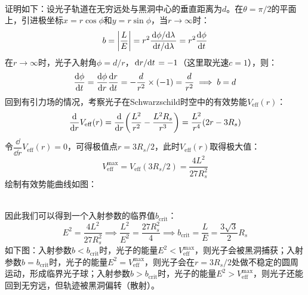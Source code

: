 \documentclass[a4paper]{article}
\begin{document}
\begin{enumerate}
{\begin{figure}
    \end{figure} \\
    证明如下：设光子轨道在无穷远处与黑洞中心的垂直距离为$d$。在$\theta = \pi/2$的平面上，引进极坐标$x = r\cos{\phi}$和$y = r\sin{\phi}$，当$r \to \infty$时：
    \[
        b = \abs{\frac{L}{E}} = r^2 \frac{\dv*{\phi}{\lambda}}{\dv*{t}{\lambda}} = r^2 \dv{\phi}{t}
    \]
    在$r \to \infty$时，光子入射角$\phi = d/r$，$\dv*{r}{t} = -1$（这里取光速$c = 1$），则：
    \[
        \dv{\phi}{t} = \dv{\phi}{r} \dv{r}{t} = -\frac{d}{r^2} \times (-1) = \frac{d}{r^2} \implies b = d
    \]
    回到有引力场的情况，考察光子在Schwarzschild时空中的有效势能$V_{\mathrm{eff}}(r)$：
    \[
        \dv{r} V_{\mathrm{eff}}(r) = \dv{r} \qty(\frac{L^2}{r^2} - \frac{L^2 R_s}{r^3}) = \frac{L^2}{r^4} \qty(2r - 3R_s)
    \]
    令$\dfrac{\dd}{\dd{r}} V_{\mathrm{eff}}(r) = 0$，可得极值点$r = 3R_s/2$，此时$V_{\mathrm{eff}}(r)$取得极大值：
    \[
        V_{\mathrm{eff}}^{\max} = V_{\mathrm{eff}}(3R_s/2) = \frac{4 L^2}{27 R_s^2}
    \]
    绘制有效势能曲线如图：
    \begin{figure}[!ht]
    \centering
    \end{figure} \\
    因此我们可以得到一个入射参数的临界值$b_{\mathrm{crit}}$：
    \[
        E^2 = \frac{4 L^2}{27 R_s^2} \implies \frac{L^2}{E^2} = \frac{27 R_s^2}{4} \implies b_{\mathrm{crit}} = \frac{L}{E} = \frac{3\sqrt{3}}{2} R_s
    \]
    如下图：入射参数$b < b_{\mathrm{crit}}$时，光子的能量$E^2 < V_{\mathrm{eff}}^{\max}$，则光子会被黑洞捕获；入射参数$b = b_{\mathrm{crit}}$时，光子的能量$E^2 = V_{\mathrm{eff}}^{\max}$，则光子会在$r = 3R_s/2$处做不稳定的圆周运动，形成临界光子球；入射参数$b > b_{\mathrm{crit}}$时，光子的能量$E^2 > V_{\mathrm{eff}}^{\max}$，则光子还能回到无穷远，但轨迹被黑洞偏转（散射）。
}
\end{enumerate}
\end{document}
